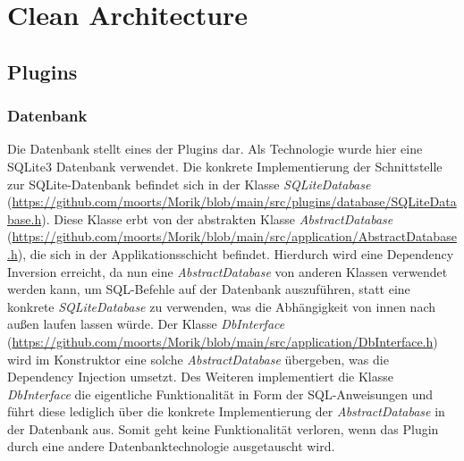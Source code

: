 \chapter{Clean Architecture}
\section{Plugins}
\subsection{Datenbank}
Die Datenbank stellt eines der Plugins dar. Als Technologie wurde hier eine SQLite3 Datenbank verwendet. Die konkrete Implementierung der Schnittstelle zur SQLite-Datenbank befindet sich in der Klasse \textit{SQLiteDatabase} (\url{https://github.com/moorts/Morik/blob/main/src/plugins/database/SQLiteDatabase.h}). Diese Klasse erbt von der abstrakten Klasse \textit{AbstractDatabase} (\url{https://github.com/moorts/Morik/blob/main/src/application/AbstractDatabase.h}), die sich in der Applikationsschicht befindet. Hierdurch wird eine Dependency Inversion erreicht, da nun eine \textit{AbstractDatabase} von anderen Klassen verwendet werden kann, um SQL-Befehle auf der Datenbank auszuführen, statt eine konkrete \textit{SQLiteDatabase} zu verwenden, was die Abhängigkeit von innen nach außen laufen lassen würde. Der Klasse \textit{DbInterface} (\url{https://github.com/moorts/Morik/blob/main/src/application/DbInterface.h}) wird im Konstruktor eine solche \textit{AbstractDatabase} übergeben, was die Dependency Injection umsetzt. Des Weiteren implementiert die Klasse \textit{DbInterface} die eigentliche Funktionalität in Form der SQL-Anweisungen und führt diese lediglich über die konkrete Implementierung der \textit{AbstractDatabase} in der Datenbank aus. Somit geht keine Funktionalität verloren, wenn das Plugin durch eine andere Datenbanktechnologie ausgetauscht wird.
